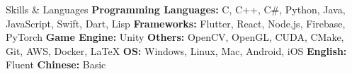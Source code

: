 \begin{rubric}{Skills \& Languages}
     \textbf{Programming Languages: } C, C++, C\#, Python, Java, JavaScript, Swift, Dart, Lisp
     \textbf{Frameworks:} Flutter, React, Node.js, Firebase, PyTorch
     \textbf{Game Engine:} Unity
     \textbf{Others:} OpenCV, OpenGL, CUDA, CMake, Git, AWS, Docker, \LaTeX
     \textbf{OS:} Windows, Linux, Mac, Android, iOS
    \entry*[Languages] \textbf{English: } Fluent
    \entry*[Languages] \textbf{Chinese: } Basic
\end{rubric}